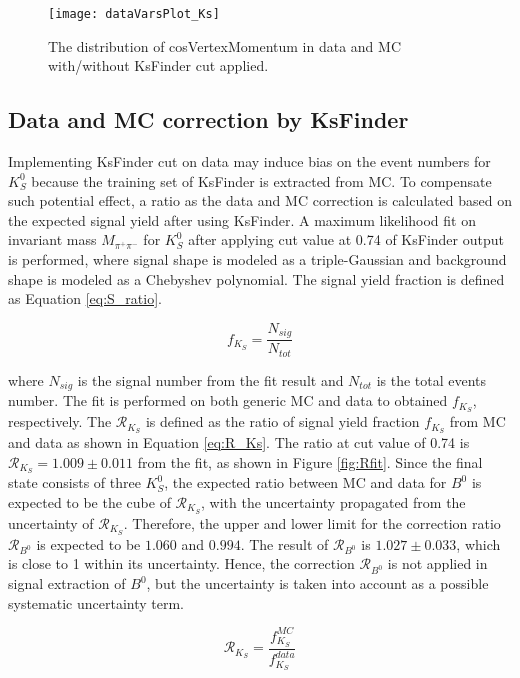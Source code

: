  \begin{figure}[htpb]
	\centering
	\texttt{[image: dataVarsPlot\_Ks]}
	\caption{The distribution of {cosVertexMomentum} in data and MC with/without KsFinder cut applied.}
	\label{fig:cosVex_dataMC}
\end{figure}

\subsection{Data and MC correction by KsFinder}
Implementing KsFinder cut on data may induce bias on the event numbers for $K_S^0$ because the training set of KsFinder is extracted from MC. To compensate such potential effect, a ratio as the data and MC correction is calculated based on the expected signal yield after using KsFinder. A maximum likelihood fit on invariant mass $M_{\pi^+\pi^-}$ for $K_S^0$ after applying cut value at 0.74 of KsFinder output is performed, where signal shape is modeled as a triple-Gaussian and background shape is modeled as a Chebyshev polynomial. The signal yield fraction is defined as Equation \ref{eq:S_ratio}.

\begin{equation}\label{eq:S_ratio}
	f_{K_S} = \frac{N_{sig}}{N_{tot}}
\end{equation}

where $N_{sig}$ is the signal number from the fit result and $N_{tot}$ is the total events number.
The fit is performed on both generic MC and data to obtained $f_{K_S} $, respectively.
The $\mathcal{R}_{K_S}$ is defined as the ratio of signal yield fraction  $f_{K_S} $ from MC and data as shown in Equation \ref{eq:R_Ks}. The ratio at cut value of 0.74 is $\mathcal{R}_{K_S} = 1.009\pm 0.011$ from the fit, as shown in Figure \ref{fig:Rfit}. Since the final state consists of three $K_S^0$, the expected ratio between MC and data for $B^0$ is expected to be the cube of $\mathcal{R}_{K_S}$, with the uncertainty propagated from the uncertainty of $\mathcal{R}_{K_S}$.  Therefore, the upper and lower limit for the correction ratio  $\mathcal{R}_{B^0}$ is expected to be $1.060$ and $0.994$. The result of $\mathcal{R}_{B^0}$ is $1.027 \pm 0.033$, which is close to 1 within its uncertainty. Hence, the correction $\mathcal{R}_{B^0}$ is not applied in signal extraction of $B^0$, but the uncertainty is taken into account as a possible systematic uncertainty term. 
 
\begin{equation}\label{eq:R_Ks}
\mathcal{R}_{K_S} = \frac{f_{K_S}^{MC}}{f_{K_S}^{data}}
\end{equation}

